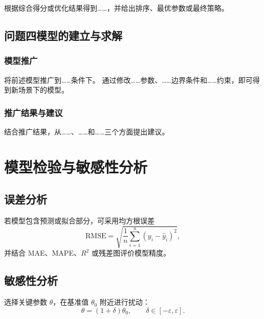 \documentclass[UTF8,fontset=none,a4paper,12pt]{ctexart}
\begin{document}
根据综合得分或优化结果得到……，并给出排序、最优参数或最终策略。

\subsection{问题四模型的建立与求解}


\subsubsection{模型推广}

将前述模型推广到……条件下。
通过修改……参数、……边界条件和……约束，即可得到新场景下的模型。

\subsubsection{推广结果与建议}

结合推广结果，从……、……和……三个方面提出建议。

\section{模型检验与敏感性分析}

\subsection{误差分析}

若模型包含预测或拟合部分，可采用均方根误差
\begin{equation}
  \mathrm{RMSE}
  = \sqrt{
      \frac{1}{n}
      \sum_{i=1}^{n}
      (y_i-\hat y_i)^2
    },
  \label{eq:rmse}
\end{equation}
并结合 MAE、MAPE、$R^2$ 或残差图评价模型精度。


\subsection{敏感性分析}

选择关键参数 $\theta$，在基准值 $\theta_0$ 附近进行扰动：
\begin{equation}
  \theta=(1+\delta)\theta_0,
  \qquad
  \delta\in[-\varepsilon,\varepsilon].
\end{equation}
\end{document}
